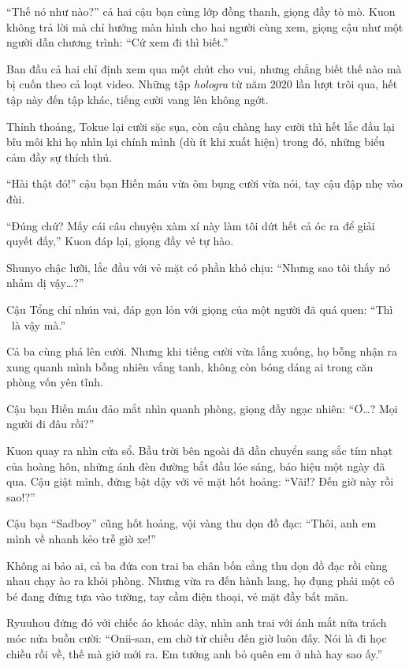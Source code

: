 \documentclass[../main.tex]{subfiles}
\begin{document}
``Thế nó như nào?'' cả hai cậu bạn cùng lớp đồng thanh, giọng đầy tò mò. Kuon không trả lời mà chỉ hướng màn hình cho hai người cùng xem, giọng cậu như một người dẫn chương trình: ``Cứ xem đi thì biết.''

\ct

Ban đầu cả hai chỉ định xem qua một chút cho vui, nhưng chẳng biết thế nào mà bị cuốn theo cả loạt video. Những tập \textit{hologra} từ năm 2020 lần lượt trôi qua, hết tập này đến tập khác, tiếng cười vang lên không ngớt.

Thỉnh thoảng, Tokue lại cười sặc sụa, còn cậu chàng hay cười thì hết lắc đầu lại bĩu môi khi họ nhìn lại chính mình (dù ít khi xuất hiện) trong đó, những biểu cảm đầy sự thích thú.

``Hài thật đó!'' cậu bạn Hiến máu vừa ôm bụng cười vừa nói, tay cậu đập nhẹ vào đùi.

``Đúng chứ? Mấy cái câu chuyện xàm xí này làm tôi dứt hết cả óc ra để giải quyết đấy,'' Kuon đáp lại, giọng đầy vẻ tự hào.

Shunyo chậc lưỡi, lắc đầu với vẻ mặt có phần khó chịu: ``Nhưng sao tôi thấy nó nhảm dị vậy\dots?''

Cậu Tổng chỉ nhún vai, đáp gọn lỏn với giọng của một người đã quá quen: ``Thì \hll\ là vậy mà.''

Cả ba cùng phá lên cười. Nhưng khi tiếng cười vừa lắng xuống, họ bỗng nhận ra xung quanh mình bỗng nhiên vắng tanh, không còn bóng dáng ai trong căn phòng vốn yên tĩnh.

Cậu bạn Hiến máu đảo mắt nhìn quanh phòng, giọng đầy ngạc nhiên: ``Ơ\dots? Mọi người đi đâu rồi?''

Kuon quay ra nhìn cửa sổ. Bầu trời bên ngoài đã dần chuyển sang sắc tím nhạt của hoàng hôn, những ánh đèn đường bắt đầu lóe sáng, báo hiệu một ngày đã qua. Cậu giật mình, đứng bật dậy với vẻ mặt hốt hoảng: ``Vãi!? Đến giờ này rồi sao!?''

Cậu bạn ``Sadboy'' cũng hốt hoảng, vội vàng thu dọn đồ đạc: ``Thôi, anh em mình về nhanh kẻo trễ giờ xe!''

Không ai bảo ai, cả ba đứa con trai ba chân bốn cẳng thu dọn đồ đạc rồi cùng nhau chạy ào ra khỏi phòng. Nhưng vừa ra đến hành lang, họ đụng phải một cô bé đang đứng tựa vào tường, tay cầm điện thoại, vẻ mặt đầy bất mãn.

Ryuuhou đứng đó với chiếc áo khoác dày, nhìn anh trai với ánh mắt nửa trách móc nửa buồn cười: ``Onii-san, em chờ từ chiều đến giờ luôn đấy. Nói là đi học chiều rồi về, thế mà giờ mới ra. Em tưởng anh bỏ quên em ở nhà hay sao ấy.''
\end{document}
